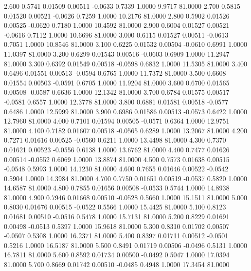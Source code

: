    2.600   0.5741   0.01509   0.00511  -0.0633   0.7339   1.0000   9.9717  81.0000
   2.700   0.5815   0.01520   0.00521  -0.0626   0.7259   1.0000  10.2176  81.0000
   2.800   0.5902   0.01526   0.00525  -0.0620   0.7180   1.0000  10.4592  81.0000
   2.900   0.6004   0.01527   0.00521  -0.0616   0.7112   1.0000  10.6696  81.0000
   3.000   0.6115   0.01527   0.00511  -0.0613   0.7051   1.0000  10.8546  81.0000
   3.100   0.6225   0.01532   0.00504  -0.0610   0.6991   1.0000  11.0397  81.0000
   3.200   0.6299   0.01543   0.00516  -0.0603   0.6909   1.0000  11.2947  81.0000
   3.300   0.6392   0.01549   0.00518  -0.0598   0.6832   1.0000  11.5305  81.0000
   3.400   0.6496   0.01551   0.00513  -0.0594   0.6765   1.0000  11.7372  81.0000
   3.500   0.6608   0.01554   0.00503  -0.0591   0.6705   1.0000  11.9204  81.0000
   3.600   0.6700   0.01565   0.00508  -0.0587   0.6636   1.0000  12.1342  81.0000
   3.700   0.6784   0.01575   0.00517  -0.0581   0.6557   1.0000  12.3778  81.0000
   3.800   0.6881   0.01581   0.00518  -0.0577   0.6486   1.0000  12.5999  81.0000
   3.900   0.6986   0.01586   0.00513  -0.0573   0.6422   1.0000  12.7960  81.0000
   4.000   0.7101   0.01594   0.00505  -0.0571   0.6364   1.0000  12.9751  81.0000
   4.100   0.7182   0.01607   0.00518  -0.0565   0.6289   1.0000  13.2067  81.0000
   4.200   0.7271   0.01616   0.00525  -0.0560   0.6211   1.0000  13.4498  81.0000
   4.300   0.7370   0.01621   0.00523  -0.0556   0.6138   1.0000  13.6762  81.0000
   4.400   0.7477   0.01626   0.00514  -0.0552   0.6069   1.0000  13.8874  81.0000
   4.500   0.7573   0.01638   0.00515  -0.0548   0.5993   1.0000  14.1230  81.0000
   4.600   0.7655   0.01646   0.00522  -0.0542   0.5904   1.0000  14.3984  81.0000
   4.700   0.7750   0.01651   0.00519  -0.0537   0.5820   1.0000  14.6587  81.0000
   4.800   0.7855   0.01656   0.00508  -0.0533   0.5744   1.0000  14.8938  81.0000
   4.900   0.7946   0.01668   0.00510  -0.0528   0.5660   1.0000  15.1511  81.0000
   5.000   0.8030   0.01676   0.00515  -0.0522   0.5566   1.0000  15.4425  81.0000
   5.100   0.8123   0.01681   0.00510  -0.0516   0.5478   1.0000  15.7131  81.0000
   5.200   0.8229   0.01691   0.00498  -0.0513   0.5397   1.0000  15.9618  81.0000
   5.300   0.8310   0.01702   0.00507  -0.0507   0.5308   1.0000  16.2371  81.0000
   5.400   0.8397   0.01711   0.00512  -0.0501   0.5216   1.0000  16.5187  81.0000
   5.500   0.8491   0.01719   0.00506  -0.0496   0.5131   1.0000  16.7811  81.0000
   5.600   0.8592   0.01734   0.00500  -0.0492   0.5047   1.0000  17.0394  81.0000
   5.700   0.8669   0.01742   0.00510  -0.0485   0.4948   1.0000  17.3454  81.0000
